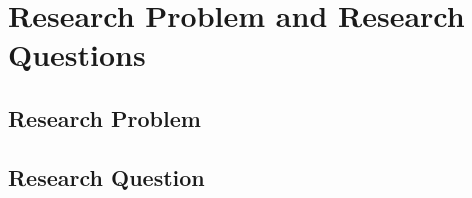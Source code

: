 \section{Research Problem and Research Questions}

\subsection{Research Problem}

\todo

\subsection{Research Question}

\todo
